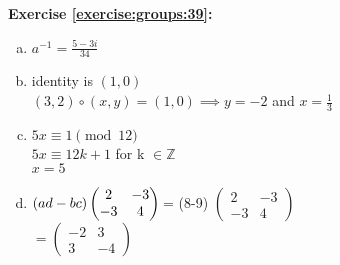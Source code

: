 \noindent\textbf{Exercise \ref{exercise:groups:39}:}\\
\begin{enumerate}[(a)]
\item
$a^{-1}=\displaystyle\frac{5-3i}{34}$

 
\item
 identity is $(1,0)$\\
$(3,2)\circ(x,y)=(1,0)\implies y=-2$ and $x=\displaystyle\frac{1}{3}$

\item
$5x \equiv 1 \pmod{12}$\\
$5x \equiv 12k + 1$ for k $\in \mathbb{ Z}$\\
$x = 5$

\item
$(ad - bc)
\begin{pmatrix}
2 &-3 \\
-3 & 4
\end{pmatrix}\\
$= (8-9)
$\begin{pmatrix}
2 &-3 \\
-3 & 4
\end{pmatrix}$\\
$= \begin{pmatrix}
-2 & 3 \\
3 & -4
\end{pmatrix}$
\end{enumerate}

